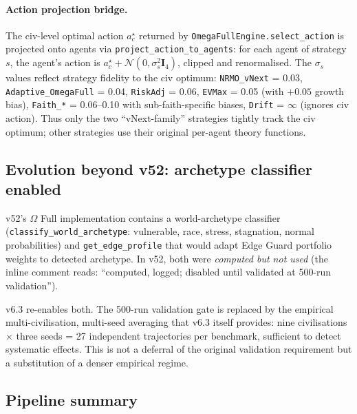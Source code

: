\paragraph{Action projection bridge.}
The civ-level optimal action $a^\star_c$ returned by
\texttt{OmegaFullEngine.select\_action} is projected onto agents via
\texttt{project\_action\_to\_agents}: for each agent of strategy $s$,
the agent's action is $a^\star_c + \mathcal{N}(0, \sigma_s^2 \mathbf{I}_4)$,
clipped and renormalised. The $\sigma_s$ values reflect strategy
fidelity to the civ optimum:
\texttt{NRMO\_vNext} = 0.03, \texttt{Adaptive\_OmegaFull} = 0.04,
\texttt{RiskAdj} = 0.06, \texttt{EVMax} = 0.05 (with $+0.05$ growth
bias), \texttt{Faith\_*} = 0.06--0.10 with sub-faith-specific biases,
\texttt{Drift} = $\infty$ (ignores civ action). Thus only the two
``vNext-family'' strategies tightly track the civ optimum; other
strategies use their original per-agent theory functions.

\subsection{Evolution beyond v52: archetype classifier enabled}

v52's $\Omega$ Full implementation contains a world-archetype classifier
(\texttt{classify\_world\_archetype}: vulnerable, race, stress,
stagnation, normal probabilities) and \texttt{get\_edge\_profile} that
would adapt Edge Guard portfolio weights to detected archetype. In v52,
both were \emph{computed but not used} (the inline comment reads:
``computed, logged; disabled until validated at 500-run validation'').

v6.3 re-enables both. The 500-run validation gate is replaced by the
empirical multi-civilisation, multi-seed averaging that v6.3 itself
provides: nine civilisations $\times$ three seeds = 27 independent
trajectories per benchmark, sufficient to detect systematic effects.
This is not a deferral of the original validation requirement but a
substitution of a denser empirical regime.

\subsection{Pipeline summary}

